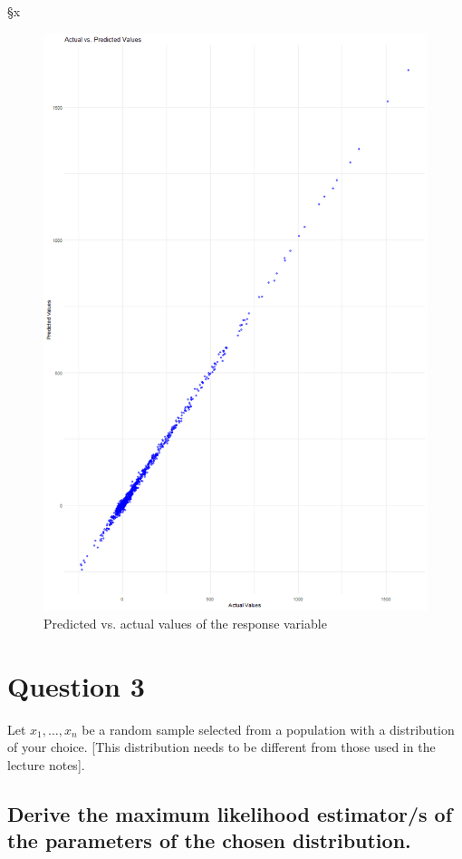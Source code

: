 §x\documentclass[]{article}
\begin{document}
\begin{figure}[H]
	\centering
	\includegraphics[width=0.7\linewidth]{img/img-2-3-2}
	\caption{Predicted vs. actual values of the response variable}
	\label{fig:img-2-3-2}
\end{figure}






\section{Question 3}

Let $x_1, \dots, x_n$ be a random sample selected from a population with a distribution of your choice. [This distribution needs to be different from those used in the lecture notes].

\subsection{Derive the maximum likelihood estimator/s of the parameters of the chosen distribution.}
\end{document}
